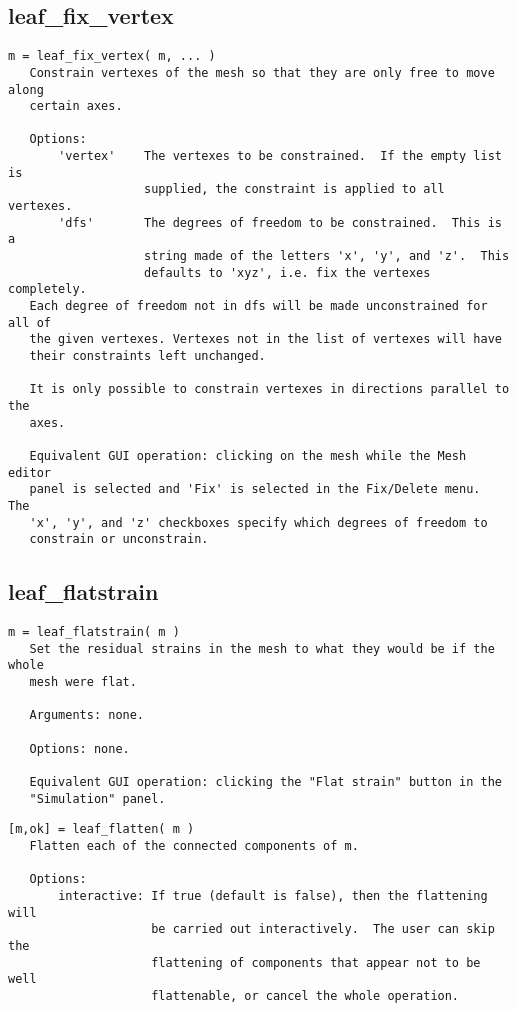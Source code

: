 \subsection{leaf\_fix\_vertex}\label{section-leaf-fix-vertex}

\begin{verbatim}
m = leaf_fix_vertex( m, ... )
   Constrain vertexes of the mesh so that they are only free to move along
   certain axes.

   Options:
       'vertex'    The vertexes to be constrained.  If the empty list is
                   supplied, the constraint is applied to all vertexes.
       'dfs'       The degrees of freedom to be constrained.  This is a
                   string made of the letters 'x', 'y', and 'z'.  This
                   defaults to 'xyz', i.e. fix the vertexes completely.
   Each degree of freedom not in dfs will be made unconstrained for all of
   the given vertexes. Vertexes not in the list of vertexes will have
   their constraints left unchanged.

   It is only possible to constrain vertexes in directions parallel to the
   axes.

   Equivalent GUI operation: clicking on the mesh while the Mesh editor
   panel is selected and 'Fix' is selected in the Fix/Delete menu.  The
   'x', 'y', and 'z' checkboxes specify which degrees of freedom to
   constrain or unconstrain.
\end{verbatim}

\subsection{leaf\_flatstrain}\label{section-leaf-flatstrain}

\begin{verbatim}
m = leaf_flatstrain( m )
   Set the residual strains in the mesh to what they would be if the whole
   mesh were flat.

   Arguments: none.

   Options: none.

   Equivalent GUI operation: clicking the "Flat strain" button in the
   "Simulation" panel.
\end{verbatim}

\begin{verbatim}
[m,ok] = leaf_flatten( m )
   Flatten each of the connected components of m.

   Options:
       interactive: If true (default is false), then the flattening will
                    be carried out interactively.  The user can skip the
                    flattening of components that appear not to be well
                    flattenable, or cancel the whole operation.
\end{verbatim}

